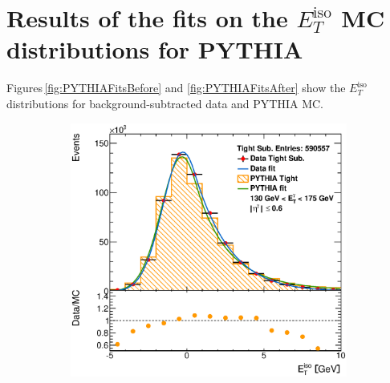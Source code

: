 \documentclass[12pt, twoside]{article}
\numberwithin{equation}{section}
\numberwithin{figure}{section}
\newenvironment{changemargin}[2]{%
\begin{list}{}{%
\setlength{\topsep}{0pt}%
\setlength{\leftmargin}{#1}%
\setlength{\rightmargin}{#2}%
\setlength{\listparindent}{\parindent}%
\setlength{\itemindent}{\parindent}%
\setlength{\parsep}{\parskip}%
}%
\item[]}{\end{list}}
\begin{document}
\section{Results of the fits on the $E^{\text{iso}}_{T}$ MC distributions for PYTHIA}
\label{appSec:EtISOCorrectionFits}

Figures\,\ref{fig:PYTHIAFitsBefore} and \ref{fig:PYTHIAFitsAfter} show the $E^{\text{iso}}_{T}$ distributions for background-subtracted data and PYTHIA MC.
\begin{figure}[H]
    \checkoddpage
    \ifoddpage
        \begin{changemargin}{-1.0cm}{-0.75cm}
    \else
        \begin{changemargin}{-0.75cm}{-1.0cm}
    \fi
    \centering
        \begin{subfigure}[b]{0.27\textwidth}
            \includegraphics[width=\textwidth]{./images/EtISOCorrection/T_MC_FITS-11(10GeV)(Before).eps}
        \end{subfigure}
        \begin{subfigure}[b]{0.27\textwidth}

\end{subfigure}
\end{changemargin}
\end{changemargin}
\end{figure}
\end{document}
